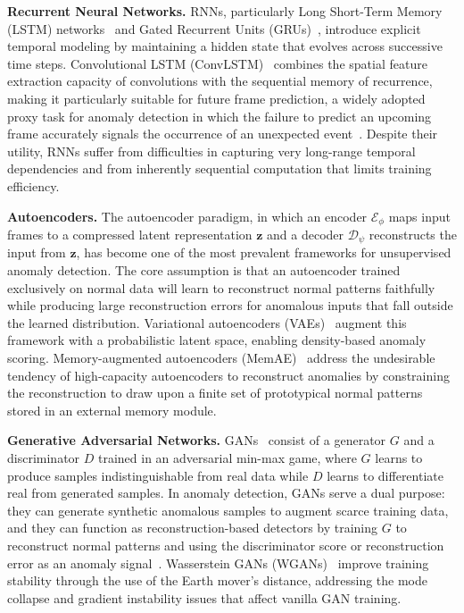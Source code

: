 \documentclass[10pt,a4paper]{article}
\begin{document}
\textbf{Recurrent Neural Networks.} RNNs, particularly Long Short-Term Memory (LSTM) networks~\citep{hochreiter1997long} and Gated Recurrent Units (GRUs)~\citep{cho2014learning}, introduce explicit temporal modeling by maintaining a hidden state that evolves across successive time steps. Convolutional LSTM (ConvLSTM)~\citep{shi2015convolutional} combines the spatial feature extraction capacity of convolutions with the sequential memory of recurrence, making it particularly suitable for future frame prediction, a widely adopted proxy task for anomaly detection in which the failure to predict an upcoming frame accurately signals the occurrence of an unexpected event~\citep{liu2018future}. Despite their utility, RNNs suffer from difficulties in capturing very long-range temporal dependencies and from inherently sequential computation that limits training efficiency.

\textbf{Autoencoders.} The autoencoder paradigm, in which an encoder $\mathcal{E}_\phi$ maps input frames to a compressed latent representation $\mathbf{z}$ and a decoder $\mathcal{D}_\psi$ reconstructs the input from $\mathbf{z}$, has become one of the most prevalent frameworks for unsupervised anomaly detection. The core assumption is that an autoencoder trained exclusively on normal data will learn to reconstruct normal patterns faithfully while producing large reconstruction errors for anomalous inputs that fall outside the learned distribution. Variational autoencoders (VAEs)~\citep{kingma2013auto} augment this framework with a probabilistic latent space, enabling density-based anomaly scoring. Memory-augmented autoencoders (MemAE)~\citep{gong2019memorizing} address the undesirable tendency of high-capacity autoencoders to reconstruct anomalies by constraining the reconstruction to draw upon a finite set of prototypical normal patterns stored in an external memory module.

\textbf{Generative Adversarial Networks.} GANs~\citep{goodfellow2014generative} consist of a generator $G$ and a discriminator $D$ trained in an adversarial min-max game, where $G$ learns to produce samples indistinguishable from real data while $D$ learns to differentiate real from generated samples. In anomaly detection, GANs serve a dual purpose: they can generate synthetic anomalous samples to augment scarce training data, and they can function as reconstruction-based detectors by training $G$ to reconstruct normal patterns and using the discriminator score or reconstruction error as an anomaly signal~\citep{ravanbakhsh2017abnormal, liu2018future}. Wasserstein GANs (WGANs)~\citep{arjovsky2017wasserstein} improve training stability through the use of the Earth mover's distance, addressing the mode collapse and gradient instability issues that affect vanilla GAN training.
\end{document}
